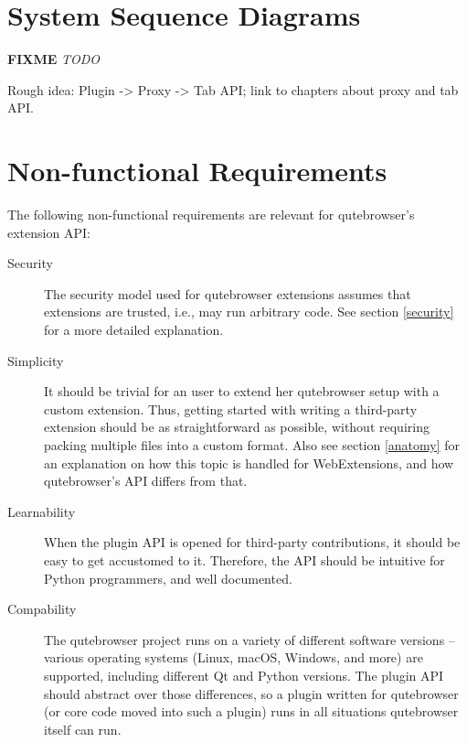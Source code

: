 \documentclass[a4paper,parskip=full]{scrreprt}
\newcommand{\fixme}[1]{\textbf{FIXME} \emph{#1}}
\begin{document}
\section{System Sequence Diagrams}
\fixme{TODO}

Rough idea: Plugin -> Proxy -> Tab API; link to chapters about proxy and tab API.


\section{Non-functional Requirements}
The following non-functional requirements are relevant for qutebrowser's
extension API:

\begin{description}
  \item[Security] The security model used for qutebrowser extensions assumes
    that extensions are trusted, i.e., may run arbitrary code. See
    section \ref{security} for a more detailed explanation.
  \item[Simplicity] It should be trivial for an user to extend her qutebrowser
    setup with a custom extension. Thus, getting started with writing a
    third-party extension should be as straightforward as possible, without
    requiring packing multiple files into a custom format. Also see section
    \ref{anatomy} for an explanation on how this topic is handled for
    WebExtensions, and how qutebrowser's API differs from that.
  \item[Learnability] When the plugin API is opened for third-party
    contributions, it should be easy to get accustomed to it. Therefore, the API
    should be intuitive for Python programmers, and well documented.
  \item[Compability] The qutebrowser project runs on a variety of different
    software versions -- various operating systems (Linux, macOS, Windows,
    and more) are supported, including different Qt and Python versions. The
    plugin API should abstract over those differences, so a plugin written for
    qutebrowser (or core code moved into such a plugin) runs in all situations
    qutebrowser itself can run.
\end{description}
\end{document}
